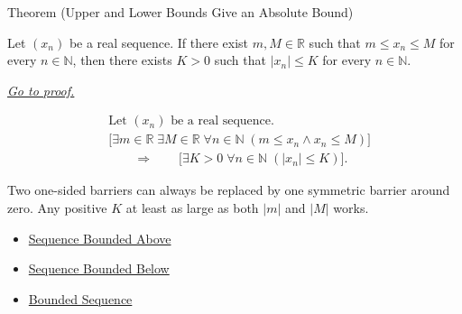 \begin{theorembox}{Theorem (Upper and Lower Bounds Give an Absolute Bound)}
\begin{theorem}
\label{thm:upper-and-lower-bounds-give-absolute-bound}
Let $(x_n)$ be a real sequence. If there exist $m,M \in \mathbb{R}$ such
that $m \le x_n \le M$ for every $n \in \mathbb{N}$, then there exists
$K > 0$ such that $|x_n| \le K$ for every $n \in \mathbb{N}$.

\smallskip
\noindent
\hyperref[prf:upper-and-lower-bounds-give-absolute-bound]{\textit{Go to proof.}}
\end{theorem}
\end{theorembox}

\begin{remark*}
\[
\begin{aligned}
&\text{Let } (x_n) \text{ be a real sequence.}\\
&\bigl[
\exists m \in \mathbb{R}\;
\exists M \in \mathbb{R}\;
\forall n \in \mathbb{N}\;(m \le x_n \land x_n \le M)
\bigr]\\
&\qquad\Longrightarrow\qquad
\bigl[
\exists K > 0\;
\forall n \in \mathbb{N}\;(|x_n| \le K)
\bigr].
\end{aligned}
\]
\end{remark*}

\begin{remark*}[Interpretation]
Two one-sided barriers can always be replaced by one symmetric barrier around
zero. Any positive $K$ at least as large as both $|m|$ and $|M|$ works.
\end{remark*}

\begin{dependencies}
\begin{itemize}
  \item \hyperref[def:sequence-bounded-above]{Sequence Bounded Above}
  \item \hyperref[def:sequence-bounded-below]{Sequence Bounded Below}
  \item \hyperref[def:bounded-sequence]{Bounded Sequence}
\end{itemize}
\end{dependencies}
